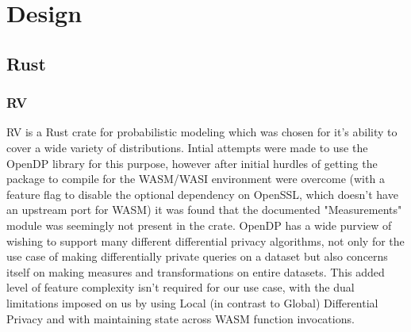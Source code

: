\chapter{Design\label{chap:design}}

\section{Rust}
\subsection{RV}
RV is a Rust crate for probabilistic modeling which was chosen for it's ability to cover a wide variety of distributions. Intial attempts were made to use the OpenDP library for this purpose, however after initial hurdles of getting the package to compile for the WASM/WASI environment were overcome (with a feature flag to disable the optional dependency on OpenSSL, which doesn't have an upstream port for WASM) it was found that the documented "Measurements" module was seemingly not present in the crate. OpenDP has a wide purview of wishing to support many different differential privacy algorithms, not only for the use case of making differentially private queries on a dataset but also concerns itself on making measures and transformations on entire datasets. This added level of feature complexity isn't required for our use case, with the dual limitations imposed on us by using Local (in contrast to Global) Differential Privacy and with maintaining state across WASM function invocations.   

